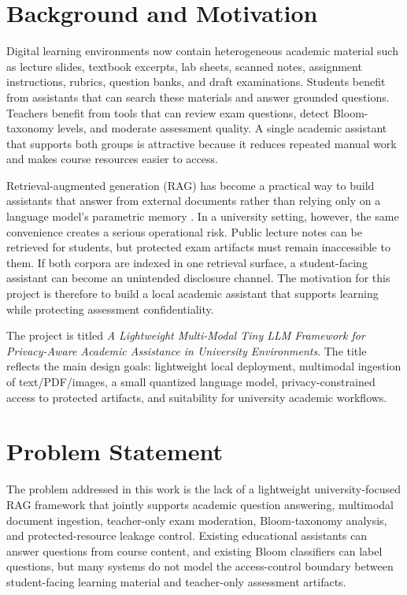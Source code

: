 \section{Background and Motivation}

Digital learning environments now contain heterogeneous academic material such as lecture slides, textbook excerpts, lab sheets, scanned notes, assignment instructions, rubrics, question banks, and draft examinations. Students benefit from assistants that can search these materials and answer grounded questions. Teachers benefit from tools that can review exam questions, detect Bloom-taxonomy levels, and moderate assessment quality. A single academic assistant that supports both groups is attractive because it reduces repeated manual work and makes course resources easier to access.

Retrieval-augmented generation (RAG) has become a practical way to build assistants that answer from external documents rather than relying only on a language model's parametric memory \cite{lewis2020rag}. In a university setting, however, the same convenience creates a serious operational risk. Public lecture notes can be retrieved for students, but protected exam artifacts must remain inaccessible to them. If both corpora are indexed in one retrieval surface, a student-facing assistant can become an unintended disclosure channel. The motivation for this project is therefore to build a local academic assistant that supports learning while protecting assessment confidentiality.

The project is titled \textit{A Lightweight Multi-Modal Tiny LLM
Framework for Privacy-Aware Academic
Assistance in University Environments}. The title reflects the main design goals: lightweight local deployment, multimodal ingestion of text/PDF/images, a small quantized language model, privacy-constrained access to protected artifacts, and suitability for university academic workflows.

\section{Problem Statement}

The problem addressed in this work is the lack of a lightweight university-focused RAG framework that jointly supports academic question answering, multimodal document ingestion, teacher-only exam moderation, Bloom-taxonomy analysis, and protected-resource leakage control. Existing educational assistants can answer questions from course content, and existing Bloom classifiers can label questions, but many systems do not model the access-control boundary between student-facing learning material and teacher-only assessment artifacts.

